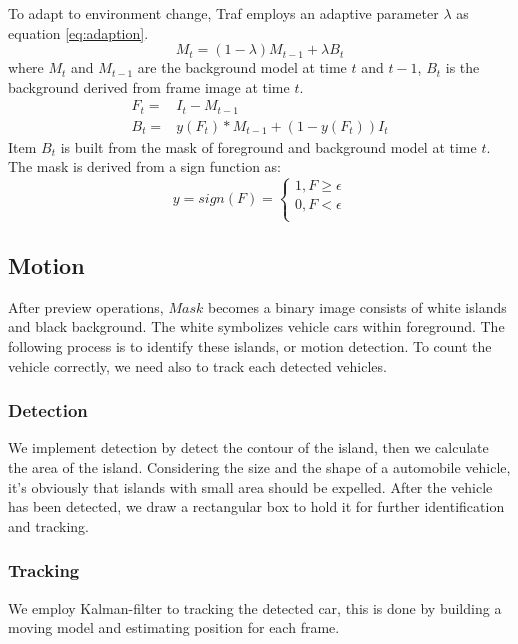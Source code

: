 \documentclass[draftclsnofoot,onecolumn]{IEEEtran}
\begin{document}
	To adapt to environment change, Traf employs an adaptive parameter $\lambda$ as equation \ref{eq:adaption}.
	\begin{equation}
	M_{t} = (1-\lambda)M_{t-1} + \lambda B_{t}
	\label{eq:adaption}
	\end{equation}
	where $M_t$ and $M_{t-1}$ are the background model at time $t$ and $t-1$, $B_{t}$ is the background derived from frame image at time $t$.
	\begin{eqnarray}	
	F_{t}=&I_{t} - M_{t-1}	\\
	B_{t}=&y(F_{t})*M_{t-1}+(1-y(F_{t}))I_{t}
	\end{eqnarray}
Item $B_{t}$ is built from the mask of foreground and background model at time $t$. The mask is derived from a sign function as:
	\begin{equation}
	  y=sign(F)=\left\{
	   \begin{aligned}
	   	1, F \geq \epsilon \\
	   	0, F < \epsilon \\
	   \end{aligned}
	   \right.
	\end{equation}			
	
				
	
	\subsection{Motion}
	After preview operations, $Mask$ becomes a binary image consists of white islands and black background. The white symbolizes vehicle cars within foreground. The following process is to identify these islands, or motion detection. To count the vehicle correctly, we need also to track each detected vehicles.
	
	\subsubsection{Detection}
	We implement detection by detect the contour of the island, then we calculate the area of the island. Considering the size and the shape of a automobile vehicle, it's obviously that islands with small area should be expelled. After the vehicle has been detected, we draw a rectangular box to hold it for further identification and tracking.
	
	
	\subsubsection{Tracking}
	We employ Kalman-filter to tracking the detected car, this is done by building a moving model and estimating position for each frame.	%
\end{document}
